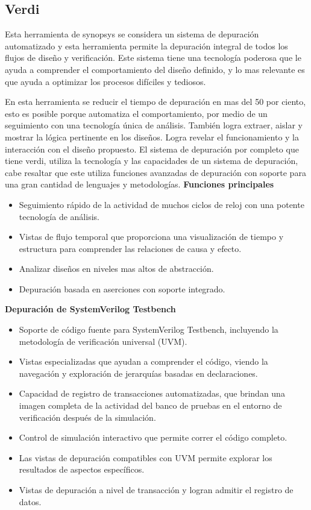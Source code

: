   \subsection*{Verdi}
  Esta herramienta de synopsys se considera un sistema de depuración automatizado y esta herramienta permite la depuración integral de todos los flujos de diseño y verificación.  Este sistema tiene una tecnología poderosa que le ayuda a comprender el comportamiento del diseño definido, y lo mas relevante es que ayuda a optimizar los procesos difíciles y tediosos.
  
  En esta herramienta se reducir el tiempo de depuración en mas del 50 por ciento, esto es posible porque automatiza el comportamiento, por medio de un seguimiento con una tecnología única de análisis. También logra extraer, aislar y mostrar la lógica pertinente en los diseños. Logra revelar el funcionamiento y la interacción con el diseño propuesto.
  El sistema de depuración por completo que tiene verdi, utiliza la tecnología y las capacidades de un sistema de depuración, cabe resaltar que este utiliza funciones avanzadas de depuración con soporte para una gran cantidad de lenguajes y metodologías.
  \cite{verdi} 
  \textbf{Funciones principales}  
  
  \begin{itemize}
    \item Seguimiento rápido de la actividad de muchos ciclos de reloj con una potente tecnología de análisis.
    \item Vistas de flujo temporal que proporciona una visualización de tiempo y estructura para comprender las relaciones de causa y efecto.
    \item Analizar diseños en niveles mas altos de abstracción.
    \item Depuración basada en aserciones con soporte integrado.
\end{itemize}

\textbf{Depuración de SystemVerilog Testbench}

\begin{itemize}
    \item Soporte de código fuente para SystemVerilog Testbench, incluyendo la metodología de verificación universal (UVM).
    \item Vistas especializadas que ayudan a comprender el código, viendo la navegación y exploración de jerarquías basadas en declaraciones.
    \item Capacidad de registro de transacciones automatizadas, que brindan una imagen completa de la actividad del banco de pruebas en el entorno de verificación después de la simulación.
    \item Control de simulación interactivo que permite correr el código completo.
    \item Las vistas de depuración compatibles con UVM permite explorar los resultados de aspectos específicos.
    \item Vistas de depuración a nivel de transacción y logran admitir el registro de datos.
\end{itemize}

